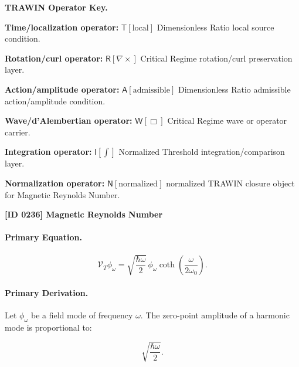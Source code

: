 \par\vspace{0.45\baselineskip}
\noindent\begin{minipage}[t]{\linewidth}
\begingroup
\small
\raggedright
\textbf{TRAWIN Operator Key.}\par
\noindent\textbf{Time/localization operator:} $\mathsf{T}\!\left[\mathrm{local}\right]$ Dimensionless Ratio local source condition.\par
\noindent\textbf{Rotation/curl operator:} $\mathsf{R}\!\left[\nabla\times\right]$ Critical Regime rotation/curl preservation layer.\par
\noindent\textbf{Action/amplitude operator:} $\mathsf{A}\!\left[\mathrm{admissible}\right]$ Dimensionless Ratio admissible action/amplitude condition.\par
\noindent\textbf{Wave/d'Alembertian operator:} $\mathsf{W}\!\left[\Box\right]$ Critical Regime wave or operator carrier.\par
\noindent\textbf{Integration operator:} $\mathsf{I}\!\left[\int\right]$ Normalized Threshold integration/comparison layer.\par
\noindent\textbf{Normalization operator:} $\mathsf{N}\!\left[\mathrm{normalized}\right]$ normalized TRAWIN closure object for Magnetic Reynolds Number.\par
\endgroup
\end{minipage}

\clearpage
\noindent\textbf{[ID 0236] Magnetic Reynolds Number}\par
\vspace{0.35em}
\paragraph{Primary Equation.}
\begin{equation}
\mathcal{V}_T\phi_{\omega}
=
\sqrt{
\frac{\hbar\omega}{2}
}
\,\phi_{\omega}
\coth\left(
\frac{\omega}{2\omega_0}
\right).
\end{equation}

\paragraph{Primary Derivation.}
Let $\phi_{\omega}$ be a field mode of frequency $\omega$.  
The zero-point amplitude of a harmonic mode is proportional to:

\begin{equation}
\sqrt{\frac{\hbar\omega}{2}} .
\end{equation}

